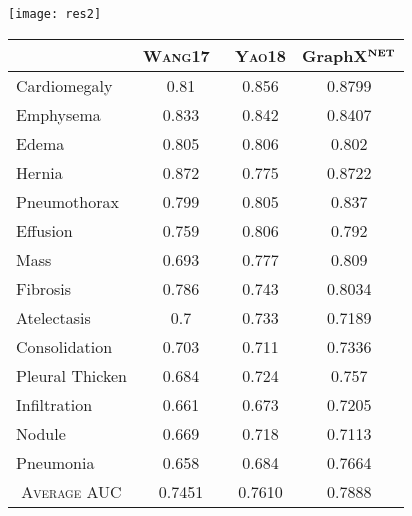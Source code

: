 \documentclass[runningheads]{llncs}
\begin{document}
\begin{table}[t!]
	\begin{minipage}{0.32\linewidth}
		\centering
		\texttt{[image: res2]}
\label{ }
	\end{minipage}
		\begin{minipage}{0.6\linewidth}
		\label{table:compre1}
		\centering
    \begin{tabular}{|l|c|c|c|}
    \hline
    \rowcolor[HTML]{EFEFEF}
    \multicolumn{1}{|c|}{\cellcolor[HTML]{EFEFEF}\textsc{Pathology}} & \textsc{Wang17}~\cite{wang2017chestx} & \textsc{Yao18}\cite{yao2018weakly} & GraphX$^{\textbf{\scriptsize NET}}$ \\ \hline
    Cardiomegaly & 0.81 & 0.856 & \cellcolor[HTML]{9AFF99}0.8799 \\ \hline
    Emphysema & 0.833 & \cellcolor[HTML]{9AFF99}0.842 & 0.8407 \\ \hline
    Edema & 0.805 & \cellcolor[HTML]{9AFF99}0.806 & 0.802 \\ \hline
    Hernia & 0.872 & 0.775 & \cellcolor[HTML]{9AFF99}0.8722 \\ \hline
    Pneumothorax & 0.799 & 0.805 & \cellcolor[HTML]{9AFF99}0.837 \\ \hline
    Effusion & 0.759 & \cellcolor[HTML]{9AFF99}0.806 & 0.792 \\ \hline
    Mass & 0.693 & 0.777 & \cellcolor[HTML]{9AFF99}0.809 \\ \hline
    Fibrosis & 0.786 & 0.743 & \cellcolor[HTML]{9AFF99}0.8034 \\ \hline
    Atelectasis & 0.7 & \cellcolor[HTML]{9AFF99}0.733 & 0.7189 \\ \hline
    Consolidation & 0.703 & 0.711 & \cellcolor[HTML]{9AFF99}0.7336 \\ \hline
    Pleural Thicken & 0.684 & 0.724 & \cellcolor[HTML]{9AFF99}0.757 \\ \hline
    Infiltration & 0.661 & 0.673 & \cellcolor[HTML]{9AFF99}0.7205 \\ \hline
    Nodule & 0.669 & \cellcolor[HTML]{9AFF99}0.718 & 0.7113 \\ \hline
    Pneumonia & 0.658 & 0.684 & \cellcolor[HTML]{9AFF99}0.7664 \\ \hline\hline
    \multicolumn{1}{|c|}{\textsc{Average} AUC} & 0.7451 & 0.7610 & \cellcolor[HTML]{9AFF99}0.7888 \\ \hline
    \end{tabular}
\end{minipage}
\end{table}
\end{document}
